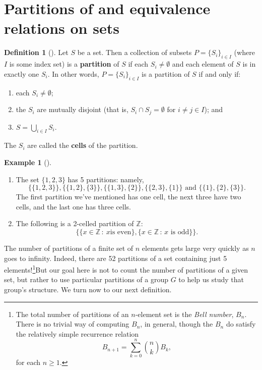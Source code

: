 \documentclass[10pt,]{book}
\newcommand{\terminology}[1]{\textbf{#1}}
\theoremstyle{plain}
\theoremstyle{definition}
\newtheorem{definition}[theorem]{Definition}
\theoremstyle{definition}
\theoremstyle{definition}
\newtheorem{example}[theorem]{Example}
\theoremstyle{definition}
\numberwithin{equation}{section}
\def\Z{\mathbb{Z}}
\begin{document}
\section[{Partitions of and equivalence relations on sets}]{Partitions of and equivalence relations on sets}\label{section-22}
\begin{definition}[{}]\label{definition-55}
Let \(S\) be a set. Then a collection of subsets \(P=\{S_i\}_{i\in I}\) (where \(I\) is some index set) is a \terminology{partition} of \(S\) if each \(S_i \neq \emptyset\) and each element of \(S\) is in exactly one \(S_i\). In other words, \(P=\{S_i\}_{i\in I}\) is a partition of \(S\) if and only if: \leavevmode%
\begin{enumerate}
\item\hypertarget{li-385}{}each \(S_i\neq \emptyset\);%
\item\hypertarget{li-386}{}the \(S_i\) are mutually disjoint (that is, \(S_i\cap S_j =
\emptyset\) for \(i\neq j \in I\)); and%
\item\hypertarget{li-387}{}\(S=\bigcup_{i\in I}S_i\).%
\end{enumerate}
%
\par
The \(S_i\) are called the \terminology{cells} of the partition.%
\end{definition}
\begin{example}[]\label{example-63}
\leavevmode%
\begin{enumerate}
\item\hypertarget{li-388}{}The set \(\{1,2,3\}\) has 5 partitions: namely,%
\begin{equation*}
\{\{1,2,3\}\},\{\{1,2\},\{3\}\}, \{\{1,3\},\{2\}\},\{\{2,3\},\{1\}\} \text{ and }  \{\{1\},\{2\},\{3\}\}.
\end{equation*}
The first partition we've mentioned has one cell, the next three have two cells, and the last one has three cells.%
\item\hypertarget{li-389}{}The following is a 2-celled partition of \(\Z\):%
\begin{equation*}
\{\{x\in \Z\,:\ x \text{
is even} \},\{x\in \Z\,:\, x\text{ is odd} \}\}.
\end{equation*}
%
\end{enumerate}
\end{example}
The number of partitions of a finite set of \(n\) elements gets large very quickly as \(n\) goes to infinity. Indeed, there are 52 partitions of a set containing just 5 elements!\footnote{The total number of partitions of an \(n\)-element set is the \emph{Bell number}, \(B_n\). There is no trivial way of computing \(B_n\), in general, though the \(B_n\) do satisfy the relatively simple recurrence relation%
\begin{equation*}
B_{n+1}=\sum_{k=0}^n \binom{n}{k} B_k,
\end{equation*}
for each \(n\geq 1\).\label{fn-4}}But our goal here is not to count the number of partitions of a given set, but rather to use particular partitions of a group \(G\) to help us study that group's structure. We turn now to our next definition.%
\end{document}
